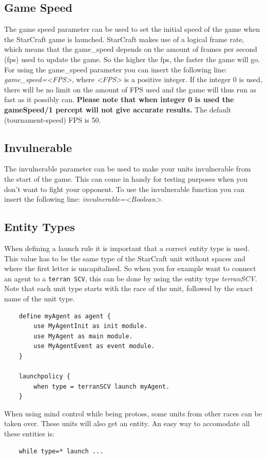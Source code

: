 \subsection{Game Speed}
\label{game speed}
The game speed parameter can be used to set the initial speed of the game when the StarCraft game is launched. StarCraft makes use of a logical frame rate, which means that the game\_speed depends on the amount of frames per second (fps) used to update the game. So the higher the fps, the faster the game will go. For using the game\_speed parameter you can insert the following line: \textit{game\_speed=<FPS>}, where \textit{<FPS>} is a positive integer. If the integer 0 is used, there will be no limit on the amount of FPS used and the game will thus run as fast as it possibly can. \textbf{Please note that when integer 0 is used the gameSpeed/1 percept will not give accurate results.} The default (tournament-speed) FPS is 50.

\subsection{Invulnerable}
\label{invulnerable}
The invulnerable parameter can be used to make your units invulnerable from the start of the game. This can come in handy for testing purposes when you don't want to fight your opponent. To use the invulnerable function you can insert the following line: \textit{invulnerable=<Boolean>}.

\subsection{Entity Types}
When defining a launch rule it is important that a correct entity type is used. This value has to be the same type of the StarCraft unit without spaces and where the first letter is uncapitalised. So when you for example want to connect an agent to a \texttt{terran SCV}, this can be done by using the entity type \textit{terranSCV}. Note that each unit type starts with the race of the unit, followed by the exact name of the unit type.

\begin{verbatim}
    define myAgent as agent {
        use MyAgentInit as init module.
        use MyAgent as main module.
        use MyAgentEvent as event module.
    }

    launchpolicy {
        when type = terranSCV launch myAgent.
    }
\end{verbatim}

When using mind control while being protoss, some units from other races can be taken over. These units will also get an entity. An easy way to accomodate all these entities is: \begin{verbatim}
    while type=* launch ...
\end{verbatim}


